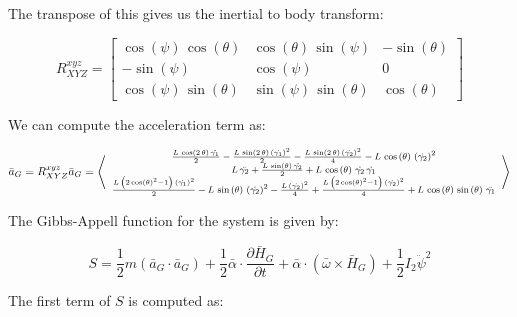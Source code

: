\documentclass[12pt, letterpaper]{../assignment}
\begin{document}
The transpose of this gives us the inertial to body transform:

$$ R_{XYZ}^{xyz} = \left[\begin{array}{ccc} \cos\left(\psi \right)\,\cos\left(\theta \right) & \cos\left(\theta \right)\,\sin\left(\psi \right) & -\sin\left(\theta \right)\\ -\sin\left(\psi \right) & \cos\left(\psi \right) & 0\\ \cos\left(\psi \right)\,\sin\left(\theta \right) & \sin\left(\psi \right)\,\sin\left(\theta \right) & \cos\left(\theta \right) \end{array}\right]$$

We can compute the acceleration term as:

$$ \bar{a}_G = R_{XYZ}^{xyz} \bar{a}_G =  {\footnotesize\left<
  \begin{array}{c}
    \frac{L\,\cos\left(2\,\theta \right)\,\ddot{\gamma_1}}{2}-\frac{L\,\sin\left(2\,\theta \right)\,{\left(\dot{\gamma_1}\right)}^2}{2}-\frac{L\,\sin\left(2\,\theta \right)\,{\left(\dot{\gamma_2}\right)}^2}{4}-L\,\cos\left(\theta \right)\,{\left(\dot{\gamma_2}\right)}^2\\
    L\,\ddot{\gamma_2}+\frac{L\,\sin\left(\theta \right)\,\ddot{\gamma_2}}{2}+L\,\cos\left(\theta \right)\,\dot{\gamma_2}\,\dot{\gamma_1}\\
    \frac{L\,\left(2\,{\cos\left(\theta \right)}^2-1\right)\,{\left(\dot{\gamma_1}\right)}^2}{2}-L\,\sin\left(\theta \right)\,{\left(\dot{\gamma_2}\right)}^2-\frac{L\,{\left(\dot{\gamma_2}\right)}^2}{4}+\frac{L\,\left(2\,{\cos\left(\theta \right)}^2-1\right)\,{\left(\dot{\gamma_2}\right)}^2}{4}+L\,\cos\left(\theta \right)\,\sin\left(\theta \right)\,\ddot{\gamma_1} \end{array}\right>}$$

The Gibbs-Appell function for the system is given by:

$$ S = \frac{1}{2}m \left(\bar{a}_G \cdot \bar{a}_G \right) 
+ \frac{1}{2} \bar{\alpha} \cdot \frac{\partial \bar{H}_G}{\partial t}
+ \bar{\alpha} \cdot \left( \bar{\omega} \times \bar{H}_G \right)
+ \frac{1}{2} I_2 \ddot{\psi}^2 $$

The first term of $S$ is computed as:
\end{document}
